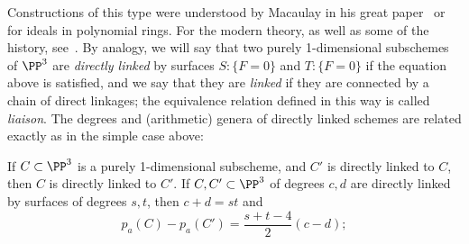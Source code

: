 Constructions of this type were understood by Macaulay in his great paper~\cite{Macaulay1913} or \cite{Eisenbud-Gray} for ideals in polynomial rings. For the modern theory, as
well as some of the history, see~\cite{MR0364271}.
By analogy, we will say that two purely 1-dimensional subschemes of $\PP^3$ are \emph{directly linked} by surfaces $S: \{F = 0\}$ and $T:  \{F = 0\}$ if
the equation above is satisfied, and we say that they are \emph{linked} if they are connected by a chain of direct linkages; the equivalence relation
defined in this way is called \emph{liaison}. The degrees and (arithmetic) genera 
of directly linked schemes are related exactly as in the simple case above:

\begin{theorem}\label{direct linkage}
If $C\subset \PP^3$ is a purely 1-dimensional subscheme, and ${C'}$ is directly linked to $C$, then $C$ is directly linked to ${C'}$.
If $C,{C'}\subset \PP^3$ of degrees $c,d$ are directly linked by surfaces of degrees $s,t$, then 
$c+d = st$ and 
 \begin{equation}\label{linked genus formula}
p_a(C) - p_a({C'}) = \frac{s+t-4}{2}(c-d);
\end{equation}
\end{theorem}

